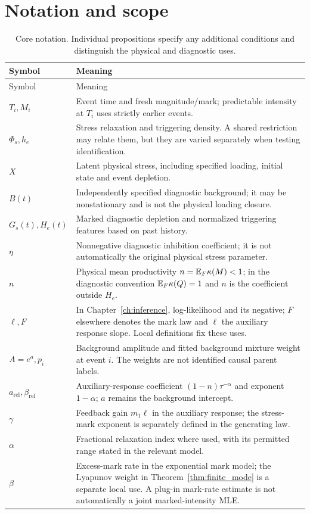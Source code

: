 \chapter{Notation and scope}
\label{app:notation}

\begin{longtable}{@{}p{}p{}@{}}
\caption{Core notation. Individual propositions specify any additional conditions and distinguish the physical and diagnostic uses.}\\
\toprule Symbol & Meaning \\
\midrule\endfirsthead
\toprule Symbol & Meaning \\\midrule\endhead
$T_i,M_i$ & Event time and fresh magnitude/mark; predictable intensity at $T_i$ uses strictly earlier events. \\
$\Phi_s,h_e$ & Stress relaxation and triggering density. A shared restriction may relate them, but they are varied separately when testing identification. \\
$X$ & Latent physical stress, including specified loading, initial state and event depletion. \\
$B(t)$ & Independently specified diagnostic background; it may be nonstationary and is not the physical loading closure. \\
$G_s(t),H_e(t)$ & Marked diagnostic depletion and normalized triggering features based on past history. \\
$\eta$ & Nonnegative diagnostic inhibition coefficient; it is not automatically the original physical stress parameter. \\
$n$ & Physical mean productivity $n=\mathbb{E} _F\kappa(M)<1$; in the diagnostic convention $\mathbb{E} _F\kappa(Q)=1$ and $n$ is the coefficient outside $H_e$. \\
$\ell,F$ & In Chapter~\ref{ch:inference}, log-likelihood and its negative; $F$ elsewhere denotes the mark law and $\ell$ the auxiliary response slope. Local definitions fix these uses. \\
$A=e^a,p_i$ & Background amplitude and fitted background mixture weight at event $i$. The weights are not identified causal parent labels. \\
$a_{\mathrm{rel}},\beta_{\mathrm{rel}}$ & Auxiliary-response coefficient $(1-n)\tau^{-\alpha}$ and exponent $1-\alpha$; $a$ remains the background intercept. \\
$\gamma$ & Feedback gain $m_1\ell$ in the auxiliary response; the stress-mark exponent is separately defined in the generating law. \\
$\alpha$ & Fractional relaxation index where used, with its permitted range stated in the relevant model. \\
$\beta$ & Excess-mark rate in the exponential mark model; the Lyapunov weight in Theorem~\ref{thm:finite_mode} is a separate local use. A plug-in mark-rate estimate is not automatically a joint marked-intensity MLE. \\
\bottomrule
\end{longtable}

